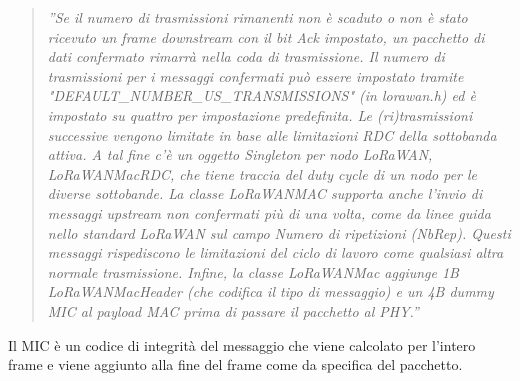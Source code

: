 \documentclass[a4paper]{report} %
\begin{document}
\begin{quote}
	\textit{''Se il numero di trasmissioni rimanenti non è scaduto o non è stato ricevuto un frame downstream con il bit Ack impostato, un pacchetto di dati confermato rimarrà nella coda di trasmissione. Il numero di trasmissioni per i messaggi confermati può essere impostato tramite "DEFAULT\_NUMBER\_US\_TRANSMISSIONS" (in lorawan.h) ed è impostato su quattro per impostazione predefinita. Le (ri)trasmissioni successive vengono limitate in base alle limitazioni RDC della sottobanda attiva. A tal fine c'è un oggetto Singleton per nodo LoRaWAN, LoRaWANMacRDC, che tiene traccia del duty cycle di un nodo per le diverse sottobande. La classe LoRaWANMAC supporta anche l'invio di messaggi upstream non confermati più di una volta, come da linee guida nello standard LoRaWAN sul campo Numero di ripetizioni (NbRep). Questi messaggi rispediscono le limitazioni del ciclo di lavoro come qualsiasi altra normale trasmissione. Infine, la classe LoRaWANMac aggiunge 1B LoRaWANMacHeader (che codifica il tipo di messaggio) e un 4B dummy MIC al payload MAC prima di passare il pacchetto al PHY.''}
\end{quote}
Il MIC è un codice di integrità del messaggio che viene calcolato per l'intero frame e viene aggiunto alla fine del frame come da specifica del pacchetto.
\end{document}
